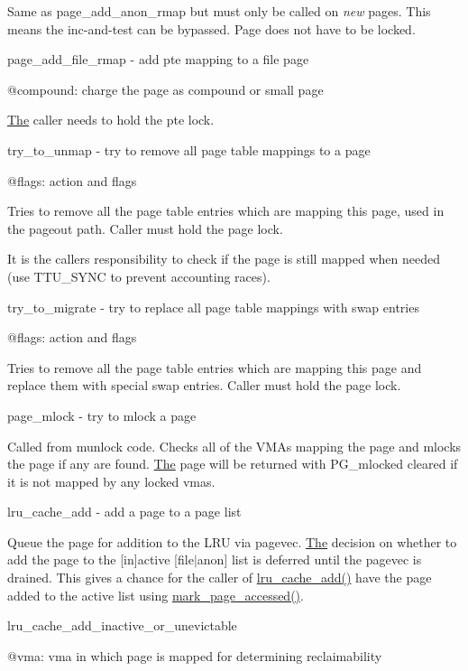 Same as page\+\_\+add\+\_\+anon\+\_\+rmap but must only be called on {\itshape new} pages. This means the inc-\/and-\/test can be bypassed. Page does not have to be locked.

page\+\_\+add\+\_\+file\+\_\+rmap -\/ add pte mapping to a file page

@compound\+: charge the page as compound or small page

\mbox{\hyperlink{classThe}{The}} caller needs to hold the pte lock.

try\+\_\+to\+\_\+unmap -\/ try to remove all page table mappings to a page

@flags\+: action and flags

Tries to remove all the page table entries which are mapping this page, used in the pageout path. Caller must hold the page lock.

It is the caller\textquotesingle{}s responsibility to check if the page is still mapped when needed (use T\+T\+U\+\_\+\+S\+Y\+NC to prevent accounting races).

try\+\_\+to\+\_\+migrate -\/ try to replace all page table mappings with swap entries

@flags\+: action and flags

Tries to remove all the page table entries which are mapping this page and replace them with special swap entries. Caller must hold the page lock.

page\+\_\+mlock -\/ try to mlock a page

Called from munlock code. Checks all of the V\+M\+As mapping the page and mlocks the page if any are found. \mbox{\hyperlink{classThe}{The}} page will be returned with P\+G\+\_\+mlocked cleared if it is not mapped by any locked vmas.

lru\+\_\+cache\+\_\+add -\/ add a page to a page list

Queue the page for addition to the L\+RU via pagevec. \mbox{\hyperlink{classThe}{The}} decision on whether to add the page to the \mbox{[}in\mbox{]}active \mbox{[}file$\vert$anon\mbox{]} list is deferred until the pagevec is drained. This gives a chance for the caller of \mbox{\hyperlink{mm_2swap_8c_a24a0c922978df84d2f84fd32fd90da3c}{lru\+\_\+cache\+\_\+add()}} have the page added to the active list using \mbox{\hyperlink{mm_2swap_8c_ac0483ff2c88088a8db13e730c30645af}{mark\+\_\+page\+\_\+accessed()}}.

lru\+\_\+cache\+\_\+add\+\_\+inactive\+\_\+or\+\_\+unevictable

@vma\+: vma in which page is mapped for determining reclaimability

